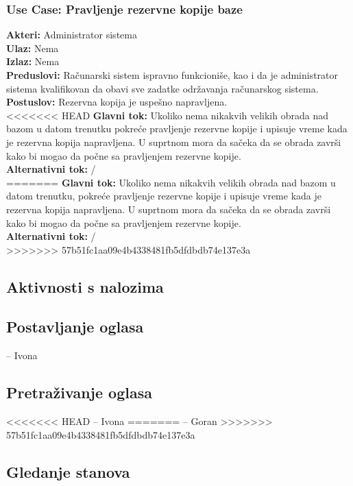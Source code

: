 \documentclass{article}
\begin{document}
\subsubsection{\bfseries Use Case: Pravljenje rezervne kopije baze}
{\bfseries Akteri:} Administrator sistema\\
{\bfseries Ulaz:} Nema\\
{\bfseries Izlaz:} Nema\\
{\bfseries Preduslovi:} Ra\v {c}unarski sistem ispravno funkcioni\v {s}e, kao i da je administrator sistema kvalifikovan da obavi sve zadatke odr\v {z}avanja ra\v {c}unarskog sistema.\\
{\bfseries Postuslov:} Rezervna kopija je uspe\v {s}no napravljena.\\
<<<<<<< HEAD
{\bfseries Glavni tok:} Ukoliko nema nikakvih velikih obrada nad bazom u datom trenutku pokre\' ce pravljenje rezervne kopije i upisuje vreme kada je rezervna kopija napravljena. U suprtnom mora da sa\v {c}eka da se obrada zavr\v {s}i kako bi mogao da po\v {c}ne sa pravljenjem rezervne kopije.\\
{\bfseries Alternativni tok:} /\\
=======
{\bfseries Glavni tok:} Ukoliko nema nikakvih velikih obrada nad bazom u datom trenutku, pokre\' ce pravljenje rezervne kopije i upisuje vreme kada je rezervna kopija napravljena. U suprtnom mora da sa\v {c}eka da se obrada zavr\v {s}i kako bi mogao da po\v {c}ne sa pravljenjem rezervne kopije.\\
{\bfseries Alternativni tok:} /\\

>>>>>>> 57b51fc1aa09e4b4338481fb5dfdbdb74e137e3a
\newpage
\subsection{\bfseries Aktivnosti s nalozima}

\newpage
\subsection{\bfseries Postavljanje oglasa}
-- Ivona

\newpage
\subsection{\bfseries Pretra\v{z}ivanje oglasa}
<<<<<<< HEAD
-- Ivona
=======
-- Goran 
>>>>>>> 57b51fc1aa09e4b4338481fb5dfdbdb74e137e3a

\newpage
\subsection{\bfseries Gledanje stanova}
\end{document}
